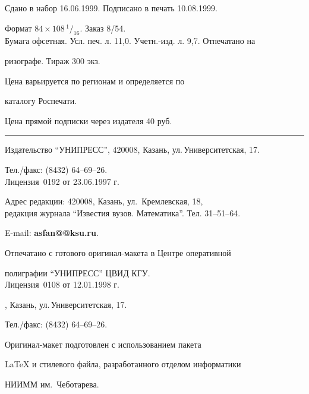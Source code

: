 \setlength{\hoffset}{-23mm}


\bigskip


\noindent Сдано в набор 16.06.1999. Подписано в печать 10.08.1999.


Формат $84\times 108 \,^1/_{16}.$ Заказ 8/54.\\


Бумага офсетная. Усл. печ. л. 11,0. Учетн.-изд. л. 9,7. Отпечатано на 


ризографе. Тираж 300 экз. 





\noindent Цена варьируется по регионам и определяется по 


каталогу Роспечати. 





\noindent Цена прямой подписки через издателя 40 руб. 


\bigskip


\hrule


\bigskip


\noindent Издательство ``УНИПРЕСС'', 420008, Казань, ул.\,Университетская, 17.


Тел./факс: (8432) 64--69--26.\\


Лицензия \No\,0192 от 23.06.1997 г.


\smallskip





\noindent Адрес редакции: 420008, Казань, ул.~Кремлевская, 18,\\  


редакция журнала  ``Известия вузов. Математика''. Тел. 31--51--64.





\noindent E-mail: {\bf asfan@@ksu.ru}. \par


\bigskip 


\noindent Отпечатано с готового оригинал-макета в Центре оперативной


полиграфии ``УНИПРЕСС'' ЦВИД КГУ. \\


Лицензия \No\,0108 от 12.01.1998 г.





, Казань, ул.\,Университетская, 17.


Тел./факс: (8432) 64--69--26. \par


\bigskip


\noindent Оригинал-макет подготовлен с использованием пакета


\AmS\LaTeX{} и стилевого файла, разработанного отделом информатики


НИИММ им.~Чеботарева.








